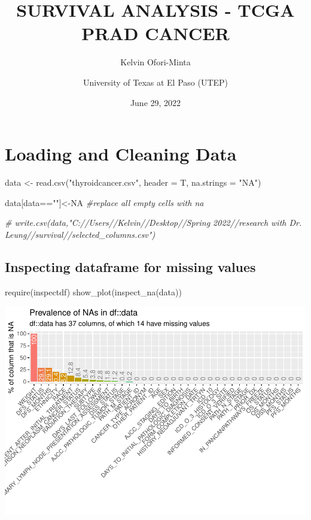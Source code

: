 \documentclass[
  11pt,
]{article}
\title{SURVIVAL ANALYSIS - TCGA PRAD CANCER}
\author{Kelvin Ofori-Minta \and University of Texas at El Paso (UTEP)}
\date{June 29, 2022}
\newenvironment{Shaded}{\begin{snugshade}}{\end{snugshade}}
\newcommand{\AttributeTok}[1]{\textcolor[rgb]{0.77,0.63,0.00}{#1}}
\newcommand{\CommentTok}[1]{\textcolor[rgb]{0.56,0.35,0.01}{\textit{#1}}}
\newcommand{\ConstantTok}[1]{\textcolor[rgb]{0.00,0.00,0.00}{#1}}
\newcommand{\FunctionTok}[1]{\textcolor[rgb]{0.00,0.00,0.00}{#1}}
\newcommand{\NormalTok}[1]{#1}
\newcommand{\OtherTok}[1]{\textcolor[rgb]{0.56,0.35,0.01}{#1}}
\newcommand{\SpecialCharTok}[1]{\textcolor[rgb]{0.00,0.00,0.00}{#1}}
\newcommand{\StringTok}[1]{\textcolor[rgb]{0.31,0.60,0.02}{#1}}
\begin{document}
\maketitle

{
\setcounter{tocdepth}{4}
\tableofcontents
}
\newpage
\section{Loading and Cleaning Data}

\begin{Shaded}
\begin{Highlighting}[]
\NormalTok{data }\OtherTok{\textless{}{-}} \FunctionTok{read.csv}\NormalTok{(}\StringTok{"thyroidcancer.csv"}\NormalTok{, }\AttributeTok{header =}\NormalTok{ T, }\AttributeTok{na.strings =} \StringTok{"NA"}\NormalTok{)}

\NormalTok{data[data}\SpecialCharTok{==}\StringTok{""}\NormalTok{]}\OtherTok{\textless{}{-}}\ConstantTok{NA} \CommentTok{\#replace all empty cells with na}

\CommentTok{\# write.csv(data,"C://Users//Kelvin//Desktop//Spring 2022//research with Dr. Leung//survival//selected\_columns.csv")}
\end{Highlighting}
\end{Shaded}

\subsection{Inspecting dataframe for missing values}

\begin{Shaded}
\begin{Highlighting}[]
\FunctionTok{require}\NormalTok{(inspectdf)}
\FunctionTok{show\_plot}\NormalTok{(}\FunctionTok{inspect\_na}\NormalTok{(data))}
\end{Highlighting}
\end{Shaded}

\includegraphics{thyroid_1_files/figure-latex/unnamed-chunk-2-1.pdf}
\end{document}
